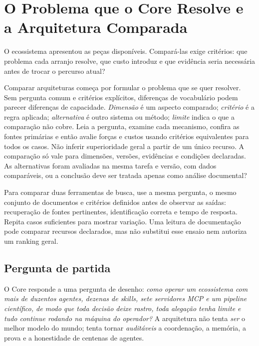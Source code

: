 \chapter{O Problema que o Core Resolve e a Arquitetura Comparada}

O ecossistema apresentou as peças disponíveis. Compará-las exige critérios: que problema cada arranjo resolve, que custo introduz e que evidência seria necessária antes de trocar o percurso atual?


\roteirodidatico
{Comparar arquiteturas começa por formular o problema que se quer resolver. Sem pergunta comum e critérios explícitos, diferenças de vocabulário podem parecer diferenças de capacidade.}
{\emph{Dimensão} é um aspecto comparado; \emph{critério} é a regra aplicada; \emph{alternativa} é outro sistema ou método; \emph{limite} indica o que a comparação não cobre.}
{Leia a pergunta, examine cada mecanismo, confira as fontes primárias e então avalie forças e custos usando critérios equivalentes para todos os casos.}
{Não inferir superioridade geral a partir de um único recurso. A comparação só vale para dimensões, versões, evidências e condições declaradas.}
{As alternativas foram avaliadas na mesma tarefa e versão, com dados comparáveis, ou a conclusão deve ser tratada apenas como análise documental?}

{Para comparar duas ferramentas de busca, use a mesma pergunta, o mesmo conjunto de documentos e critérios definidos antes de observar as saídas: recuperação de fontes pertinentes, identificação correta e tempo de resposta. Repita casos suficientes para mostrar variação. Uma leitura de documentação pode comparar recursos declarados, mas não substitui esse ensaio nem autoriza um ranking geral.}

\section{Pergunta de partida}


\begin{conceito}
O Core responde a uma pergunta de desenho: \emph{como operar um ecossistema com
mais de duzentos agentes, dezenas de skills, sete servidores MCP e um pipeline
científico, de modo que toda decisão deixe rastro, toda alegação tenha limite e
tudo continue rodando na máquina do operador?} A arquitetura não tenta \emph{ser}
o melhor modelo do mundo; tenta tornar \emph{auditáveis} a coordenação, a memória,
a prova e a honestidade de centenas de agentes.
\end{conceito}

